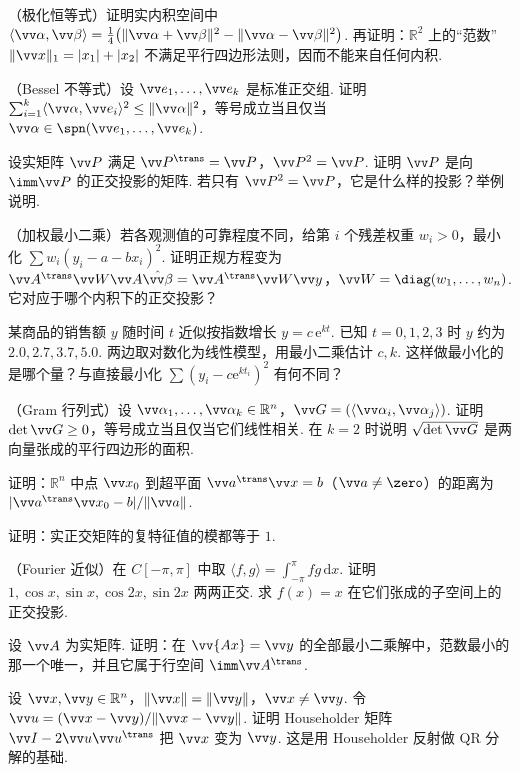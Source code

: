 {		\Bgroup
		\begin{exB}
			\item\label{ex:ip:B1} （极化恒等式）证明实内积空间中 $\langle\vv\alpha,\vv\beta\rangle=\frac14\big(\|\vv\alpha+\vv\beta\|^2-\|\vv\alpha-\vv\beta\|^2\big)$. 再证明：$\mathbb{R}^2$ 上的“范数” $\|\vv x\|_1=|x_1|+|x_2|$ 不满足平行四边形法则，因而不能来自任何内积.
			\item\label{ex:ip:B2} （Bessel 不等式）设 $\vv e_1,\ldots,\vv e_k$ 是标准正交组. 证明 $\sum_{i=1}^k\langle\vv\alpha,\vv e_i\rangle^2\le\|\vv\alpha\|^2$，等号成立当且仅当 $\vv\alpha\in\spn(\vv e_1,\ldots,\vv e_k)$.
			\item\label{ex:ip:B3} 设实矩阵 $\vv P$ 满足 $\vv P^\trans=\vv P$，$\vv P^2=\vv P$. 证明 $\vv P$ 是向 $\imm\vv P$ 的正交投影的矩阵. 若只有 $\vv P^2=\vv P$，它是什么样的投影？举例说明.
			\item\label{ex:ip:B4} （加权最小二乘）若各观测值的可靠程度不同，给第 $i$ 个残差权重 $w_i>0$，最小化 $\sum w_i(y_i-a-bx_i)^2$. 证明正规方程变为 $\vv A^\trans\vv W\vv A\hat{\vv\beta}=\vv A^\trans\vv W\vv y$，$\vv W=\diag(w_1,\ldots,w_n)$. 它对应于哪个内积下的正交投影？
			\item\label{ex:ip:B5} 某商品的销售额 $y$ 随时间 $t$ 近似按指数增长 $y=c\,\mathrm e^{kt}$. 已知 $t=0,1,2,3$ 时 $y$ 约为 $2.0,2.7,3.7,5.0$. 两边取对数化为线性模型，用最小二乘估计 $c,k$. 这样做最小化的是哪个量？与直接最小化 $\sum(y_i-c\mathrm e^{kt_i})^2$ 有何不同？
			\item\label{ex:ip:B6} （Gram 行列式）设 $\vv\alpha_1,\ldots,\vv\alpha_k\in\mathbb{R}^n$，$\vv G=(\langle\vv\alpha_i,\vv\alpha_j\rangle)$. 证明 $\det\vv G\ge0$，等号成立当且仅当它们线性相关. 在 $k=2$ 时说明 $\sqrt{\det\vv G}$ 是两向量张成的平行四边形的面积.
			\item\label{ex:ip:B7} 证明：$\mathbb{R}^n$ 中点 $\vv x_0$ 到超平面 $\vv a^\trans\vv x=b$（$\vv a\ne\zero$）的距离为 $|\vv a^\trans\vv x_0-b|/\|\vv a\|$.
			\item\label{ex:ip:B8} 证明：实正交矩阵的复特征值的模都等于 $1$.
			\item\label{ex:ip:B9} （Fourier 近似）在 $C[-\pi,\pi]$ 中取 $\langle f,g\rangle=\int_{-\pi}^\pi fg\,\mathrm dx$. 证明 $1,\cos x,\sin x,\cos2x,\sin2x$ 两两正交. 求 $f(x)=x$ 在它们张成的子空间上的正交投影.
			\item\label{ex:ip:B10} 设 $\vv A$ 为实矩阵. 证明：在 $\vv{Ax}=\vv y$ 的全部最小二乘解中，范数最小的那一个唯一，并且它属于行空间 $\imm\vv A^\trans$.
			\item\label{ex:ip:B11} 设 $\vv x,\vv y\in\mathbb{R}^n$，$\|\vv x\|=\|\vv y\|$，$\vv x\ne\vv y$. 令 $\vv u=(\vv x-\vv y)/\|\vv x-\vv y\|$. 证明 Householder 矩阵 $\vv I-2\vv u\vv u^\trans$ 把 $\vv x$ 变为 $\vv y$. 这是用 Householder 反射做 QR 分解的基础.

\end{exB}}
